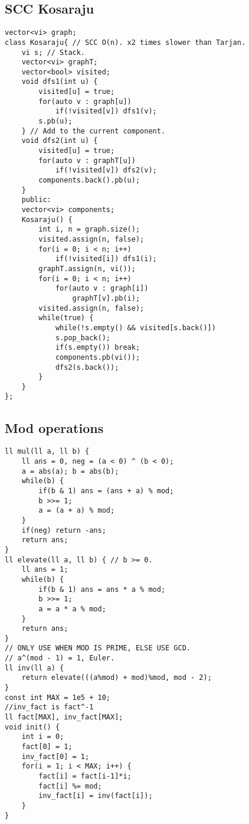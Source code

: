 \documentclass[a4paper]{article}
\begin{document}
\subsection*{SCC Kosaraju}
\begin{multicols}{2}
\begin{verbatim}
vector<vi> graph;
class Kosaraju{ // SCC O(n). x2 times slower than Tarjan.
    vi s; // Stack.
    vector<vi> graphT;
    vector<bool> visited;
    void dfs1(int u) {
        visited[u] = true;
        for(auto v : graph[u])
            if(!visited[v]) dfs1(v);
        s.pb(u);
    } // Add to the current component.
    void dfs2(int u) {
        visited[u] = true;
        for(auto v : graphT[u])
            if(!visited[v]) dfs2(v); 
        components.back().pb(u); 
    }
    public:
    vector<vi> components;
    Kosaraju() {
        int i, n = graph.size();
        visited.assign(n, false);
        for(i = 0; i < n; i++)
            if(!visited[i]) dfs1(i);
        graphT.assign(n, vi());
        for(i = 0; i < n; i++) 
            for(auto v : graph[i])
                graphT[v].pb(i);
        visited.assign(n, false);
        while(true) {
            while(!s.empty() && visited[s.back()])
            s.pop_back();
            if(s.empty()) break;
            components.pb(vi());
            dfs2(s.back());
        }
    }
};
\end{verbatim}
\end{multicols}
\subsection*{Mod operations}
\begin{multicols}{2}
\begin{verbatim}
ll mul(ll a, ll b) {
    ll ans = 0, neg = (a < 0) ^ (b < 0);
    a = abs(a); b = abs(b);
    while(b) {
        if(b & 1) ans = (ans + a) % mod;
        b >>= 1;
        a = (a + a) % mod;
    }
    if(neg) return -ans;
    return ans;
}
ll elevate(ll a, ll b) { // b >= 0.
    ll ans = 1;
    while(b) {
        if(b & 1) ans = ans * a % mod;
        b >>= 1;
        a = a * a % mod;
    }
    return ans;
}
// ONLY USE WHEN MOD IS PRIME, ELSE USE GCD.
// a^(mod - 1) = 1, Euler.
ll inv(ll a) {
    return elevate(((a%mod) + mod)%mod, mod - 2);
}
const int MAX = 1e5 + 10;
//inv_fact is fact^-1
ll fact[MAX], inv_fact[MAX];
void init() {
    int i = 0;
    fact[0] = 1;
    inv_fact[0] = 1;
    for(i = 1; i < MAX; i++) {
        fact[i] = fact[i-1]*i;
        fact[i] %= mod;
        inv_fact[i] = inv(fact[i]);
    }
}
\end{verbatim}
\end{multicols}
\end{document}
